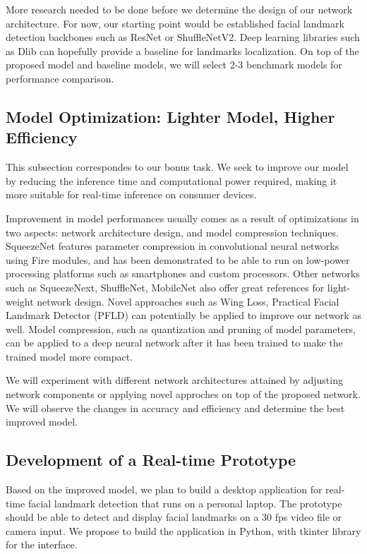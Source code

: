 \documentclass[12pt]{article}
\begin{document}
More research needed to be done before we determine the design of our network architecture. For now, our starting point would be established facial landmark detection backbones such as ResNet\cite{He.12112015} or ShuffleNetV2\cite{Ma.7302018}. Deep learning libraries such as Dlib can hopefully provide a baseline for landmarks localization\cite{Khabarlak.2022}. On top of the proposed model and baseline models, we will select 2-3 benchmark models for performance comparison.

\subsection{Model Optimization: Lighter Model, Higher Efficiency}

This subsection correspondes to our bonus task. We seek to improve our model by reducing the inference time and computational power required, making it more suitable for real-time inference on consumer devices.

Improvement in model performances usually comes as a result of optimizations in two aspects: network architecture design, and model compression techniques. SqueezeNet\cite{Iandola.2242016} features parameter compression in convolutional neural networks using Fire modules, and has been demonstrated to be able to run on low-power processing platforms such as smartphones and custom processors. Other networks such as SqueezeNext\cite{Gholami.}, ShuffleNet\cite{Ma.7302018}, MobileNet\cite{Howard.4172017} also offer great references for light-weight network design. Novel approaches such as Wing Loss\cite{Feng.11182017}, Practical Facial Landmark Detector (PFLD)\cite{Guo.2282019} can potentially be applied to improve our network as well. Model compression, such as quantization and pruning of model parameters, can be applied to a deep neural network after it has been trained to make the trained model more compact.

We will experiment with different network architectures attained by adjusting network components or applying novel approches on top of the proposed network. We will observe the changes in accuracy and efficiency and determine the best improved model.

\subsection{Development of a Real-time Prototype}

Based on the improved model, we plan to build a desktop application for real-time facial landmark detection that runs on a personal laptop. The prototype should be able to detect and display facial landmarks on a 30 fps video file or camera input. We propose to build the application in Python, with tkinter library for the interface.
\end{document}
